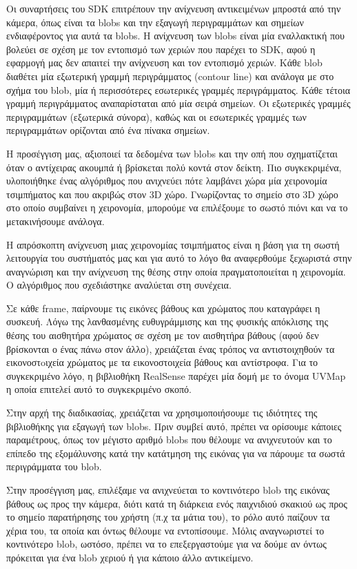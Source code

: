 Οι συναρτήσεις του SDK επιτρέπουν την ανίχνευση αντικειμένων μπροστά από την κάμερα, όπως είναι τα blobs και την εξαγωγή περιγραμμάτων και σημείων ενδιαφέροντος για αυτά τα blobs. Η ανίχνευση των blobs είναι μία εναλλακτική που βολεύει σε σχέση με τον εντοπισμό των χεριών που παρέχει το SDK, αφού η εφαρμογή μας δεν απαιτεί την ανίχνευση και τον εντοπισμό χεριών. Κάθε blob διαθέτει μία εξωτερική γραμμή περιγράμματος (contour line) και ανάλογα με στο σχήμα του blob, μία ή περισσότερες εσωτερικές γραμμές περιγράμματος. Κάθε τέτοια γραμμή περιγράμματος αναπαρίσταται από μία σειρά σημείων. Οι εξωτερικές γραμμές περιγραμμάτων (εξωτερικά σύνορα), καθώς και οι εσωτερικές γραμμές των περιγραμμάτων ορίζονται από ένα πίνακα σημείων.


Η προσέγγιση μας, αξιοποιεί τα δεδομένα των blobs και την οπή που σχηματίζεται όταν ο αντίχειρας ακουμπά ή βρίσκεται πολύ κοντά στον δείκτη. Πιο συγκεκριμένα, υλοποιήθηκε ένας αλγόριθμος που ανιχνεύει πότε λαμβάνει χώρα μία χειρονομία τσιμπήματος και που ακριβώς στον 3D χώρο. Γνωρίζοντας το σημείο στο 3D χώρο στο οποίο συμβαίνει η χειρονομία, μπορούμε να επιλέξουμε το σωστό πιόνι και να το μετακινήσουμε ανάλογα. 


Η απρόσκοπτη ανίχνευση μιας χειρονομίας τσιμπήματος είναι η βάση για τη σωστή λειτουργία του συστήματός μας και για αυτό το λόγο θα αναφερθούμε ξεχωριστά στην αναγνώριση και την ανίχνευση της θέσης στην οποία πραγματοποιείται η χειρονομία. Ο αλγόριθμος που σχεδιάστηκε αναλύεται στη συνέχεια.



Σε κάθε frame, παίρνουμε τις εικόνες βάθους και χρώματος που καταγράφει η συσκευή. Λόγω της λανθασμένης ευθυγράμμισης και της φυσικής απόκλισης της θέσης του αισθητήρα χρώματος σε σχέση με τον αισθητήρα βάθους (αφού δεν βρίσκονται ο ένας πάνω στον άλλο), χρειάζεται ένας τρόπος να αντιστοιχηθούν τα εικονοστoιχεία χρώματος με τα εικονοστοιχεία βάθους και αντίστροφα. Για το συγκεκριμένο λόγο, η βιβλιοθήκη RealSense παρέχει μία δομή με το όνομα UVMap η οποία επιτελεί αυτό το συγκεκριμένο σκοπό.

Στην αρχή της διαδικασίας, χρειάζεται να χρησιμοποιήσουμε τις ιδιότητες της βιβλιοθήκης για εξαγωγή των blobs. Πριν συμβεί αυτό, πρέπει να ορίσουμε κάποιες παραμέτρους, όπως τον μέγιστο αριθμό blobs που θέλουμε να ανιχνευτούν και το επίπεδο της εξομάλυνσης κατά την κατάτμηση της εικόνας για να πάρουμε τα σωστά περιγράμματα του blob. 

Στην προσέγγιση μας, επιλέξαμε να ανιχνεύεται το κοντινότερο blob της εικόνας βάθους ως προς την κάμερα, διότι κατά τη διάρκεια ενός παιχνιδιού σκακιού ως προς το σημείο παρατήρησης του χρήστη (π.χ τα μάτια του), το ρόλο αυτό παίζουν τα χέρια του, τα οποία και όντως θέλουμε να εντοπίσουμε. Μόλις αναγνωριστεί το κοντινότερο blob, ωστόσο, πρέπει να το επεξεργαστούμε για να δούμε αν όντως πρόκειται για ένα blob χεριού ή για κάποιο άλλο αντικείμενο.



